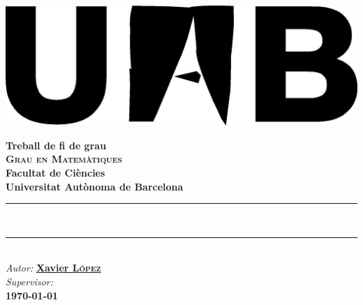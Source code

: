 \documentclass[
11pt, %
catalan, %
singlespacing, %
headsepline, %
consistentlayout, %
]{MastersDoctoralThesis} %
\author{} %
\theoremstyle{definition}
\begin{document}
\frontmatter %

\pagestyle{plain} %


\begin{titlepage}
\begin{center}

\includegraphics[scale=.5]{Figures/uab.jpg}

\vspace*{.06\textheight}

\LARGE \textbf{Treball de fi de grau}\\[0.25cm] %
\textsc{\huge \textbf{Grau en Matemàtiques}}\\[1cm] %
\LARGE \textbf{Facultat de Ciències} %
\LARGE \\\textbf{Universitat Autònoma de Barcelona}\\[0.5cm] %

\rule{\textwidth}{2pt}\\[0.4cm] %
{\Huge \bfseries \ttitle\par}\vspace{0.4cm} %
\rule{\textwidth}{2pt} \\[1.5cm] %
 
\vfill
\LARGE 
\emph{Autor:}
\href{http://}{ {\textbf{Xavier \textsc{López}}}}
\\[.5cm]
\LARGE
\emph{Supervisor:} 
\href{http://}{\supname}
\\[1cm]


{\Large \textbf{ \today }}\\[4cm] %
 
\vfill
\vfill
\end{center}
\end{titlepage}
\end{document}
